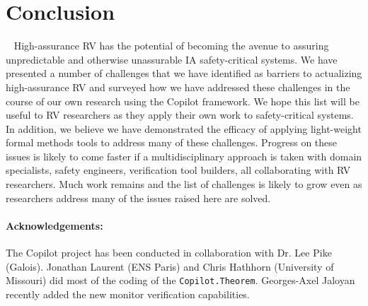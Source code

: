 \section{Conclusion}~\label{sec:conclusion} High-assurance RV has
the potential of becoming the avenue to assuring unpredictable and
otherwise unassurable IA safety-critical systems. We have presented a
number of challenges that we have identified as barriers to
actualizing high-assurance RV and surveyed how we have addressed these
challenges in the course of our own research using the Copilot
framework. We hope this list will be useful to RV researchers as they
apply their own work to safety-critical systems.  In addition, we
believe we have demonstrated the efficacy of applying light-weight
formal methods tools to address many of these challenges.  Progress on
these issues is likely to come faster if a multidisciplinary approach
is taken with domain specialists, safety engineers, verification tool
builders, all collaborating with RV researchers. Much work
remains and the list of challenges is likely to grow even as
researchers address many of the issues raised here are solved. 

\paragraph{Acknowledgements:} The Copilot project  has
been conducted in collaboration with Dr. Lee Pike (Galois).  Jonathan
Laurent (ENS Paris)  and Chris Hathhorn (University of Missouri) did
most of the coding of the {\tt Copilot.Theorem}.   Georges-Axel
Jaloyan  recently added the new  monitor verification capabilities. 